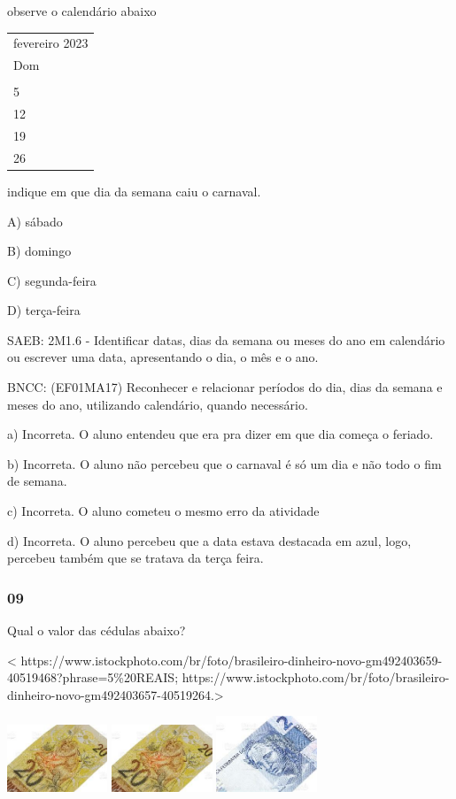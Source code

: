 observe o calendário abaixo

\begin{longtable}[]{@{}l@{}}
\toprule
fevereiro 2023\tabularnewline
Dom\tabularnewline
\tabularnewline
5\tabularnewline
12\tabularnewline
19\tabularnewline
26\tabularnewline
\bottomrule
\end{longtable}

indique em que dia da semana caiu o carnaval.

A) sábado

B) domingo

C) segunda-feira

D) terça-feira

SAEB: 2M1.6 - Identificar datas, dias da semana ou meses do ano em
calendário ou escrever uma data, apresentando o dia, o mês e o ano.

BNCC: (EF01MA17) Reconhecer e relacionar períodos do dia, dias da semana
e meses do ano, utilizando calendário, quando necessário.

a) Incorreta. O aluno entendeu que era pra dizer em que dia começa o
feriado.

b) Incorreta. O aluno não percebeu que o carnaval é só um dia e não todo
o fim de semana.

c) Incorreta. O aluno cometeu o mesmo erro da atividade

d) Incorreta. O aluno percebeu que a data estava destacada em azul,
logo, percebeu também que se tratava da terça feira.

\subsubsection{09}\label{section-95}

Qual o valor das cédulas abaixo?

\textless{}
https://www.istockphoto.com/br/foto/brasileiro-dinheiro-novo-gm492403659-40519468?phrase=5\%20REAIS;
https://www.istockphoto.com/br/foto/brasileiro-dinheiro-novo-gm492403657-40519264.\textgreater{}

\includegraphics[width=1.18253in,height=0.78643in]{media/image108.jpg}
\includegraphics[width=1.18253in,height=0.78643in]{media/image108.jpg}
\includegraphics[width=1.18253in,height=0.88690in]{media/image109.jpg}

